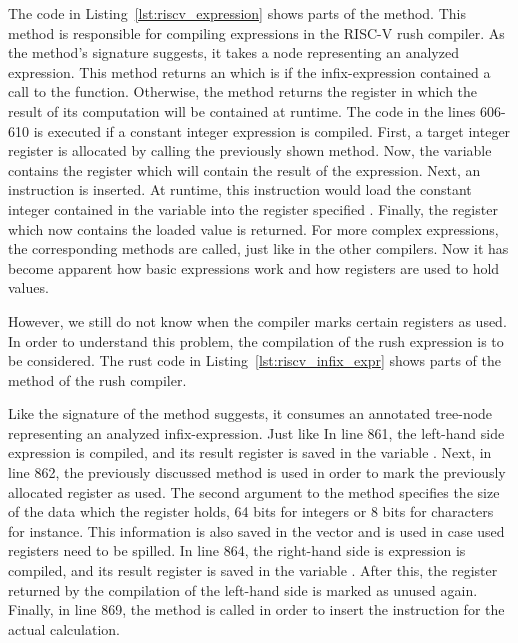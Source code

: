 
The code in Listing~\ref{lst:riscv_expression} shows parts of the  method.
This method is responsible for compiling expressions in the RISC-V rush compiler.
As the method's signature suggests, it takes a node representing an analyzed expression.
This method returns an  which is  if the infix-expression contained a call to the  function.
Otherwise, the method returns the register in which the result of its computation will be contained at runtime.
The code in the lines 606-610 is executed if a constant integer expression is compiled.
First, a target integer register is allocated by calling the previously shown  method.
Now, the  variable contains the register which will contain the result of the expression.
Next, an  instruction is inserted.
At runtime, this instruction would load the constant integer contained in the variable  into the register specified .
Finally, the register which now contains the loaded value is returned.
For more complex expressions, the corresponding methods are called, just like in the other compilers.
Now it has become apparent how basic expressions work and how registers are used to hold values.

However, we still do not know when the compiler marks certain registers as used.
In order to understand this problem, the compilation of the rush expression  is to be considered.
The rust code in Listing~\ref{lst:riscv_infix_expr} shows parts of the  method of the rush compiler.


Like the signature of the method suggests, it consumes an annotated tree-node representing an analyzed infix-expression.
Just like 
In line 861, the left-hand side expression is compiled, and its result register is saved in the variable .
Next, in line 862, the previously discussed  method is used in order to mark the previously allocated register as used.
The second argument to the method specifies the size of the data which the register holds, 64 bits for integers or 8 bits for characters for instance.
This information is also saved in the  vector and is used in case used registers need to be spilled.
In line 864, the right-hand side is expression is compiled, and its result register is saved in the variable .
After this, the register returned by the compilation of the left-hand side is marked as unused again.
Finally, in line 869, the  method is called in order to insert the instruction for the actual calculation.


